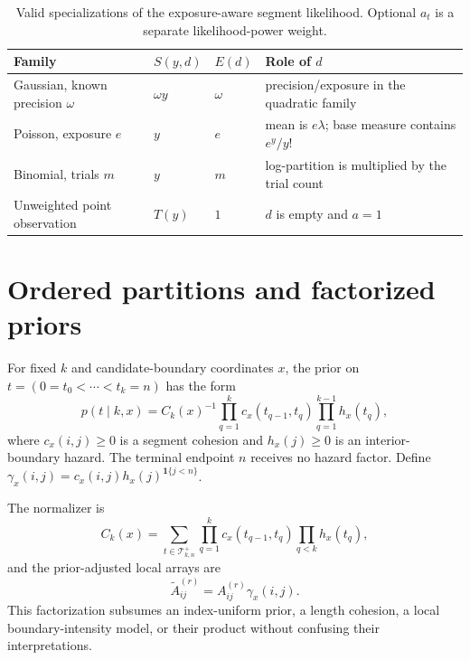 \begin{table}[H]
\centering\small
\begin{tabularx}{\textwidth}{@{}lXXX@{}}
\toprule
Family & $S(y,d)$ & $E(d)$ & Role of $d$\\ \midrule
Gaussian, known precision $\omega$ & $\omega y$ & $\omega$ & precision/exposure in the quadratic family\\
Poisson, exposure $e$ & $y$ & $e$ & mean is $e\lambda$; base measure contains $e^y/y!$\\
Binomial, trials $m$ & $y$ & $m$ & log-partition is multiplied by the trial count\\
Unweighted point observation & $T(y)$ & $1$ & $d$ is empty and $a=1$\\
\bottomrule
\end{tabularx}
\caption{Valid specializations of the exposure-aware segment likelihood. Optional $a_t$ is a separate likelihood-power weight.}
\label{tab:exposure-model}
\end{table}

\section{Ordered partitions and factorized priors}
\begin{assumption}
\label{ass:factorizing-prior}
For fixed $k$ and candidate-boundary coordinates $x$, the prior on
$t=(0=t_0<\cdots<t_k=n)$ has the form
\begin{equation}
 p(t\mid k,x)=C_k(x)^{-1}
 \prod_{q=1}^{k}c_x(t_{q-1},t_q)
 \prod_{q=1}^{k-1}h_x(t_q),
\label{eq:partition-prior-factor}
\end{equation}
where $c_x(i,j)\ge0$ is a segment cohesion and $h_x(j)\ge0$ is an interior-boundary hazard.
The terminal endpoint $n$ receives no hazard factor. Define
$\gamma_x(i,j)=c_x(i,j)h_x(j)^{\mathbf1\{j<n\}}$.
\end{assumption}
The normalizer is
\begin{equation}
 C_k(x)=\sum_{t\in\mathcal T^+_{k,n}}
 \prod_{q=1}^{k}c_x(t_{q-1},t_q)\prod_{q<k}h_x(t_q),
\label{eq:Ck-setup}
\end{equation}
and the prior-adjusted local arrays are
\begin{equation}
 \widetilde A^{(r)}_{ij}=A^{(r)}_{ij}\gamma_x(i,j).
\label{eq:Atilde-setup}
\end{equation}
This factorization subsumes an index-uniform prior, a length cohesion, a local boundary-intensity
model, or their product without confusing their interpretations.
